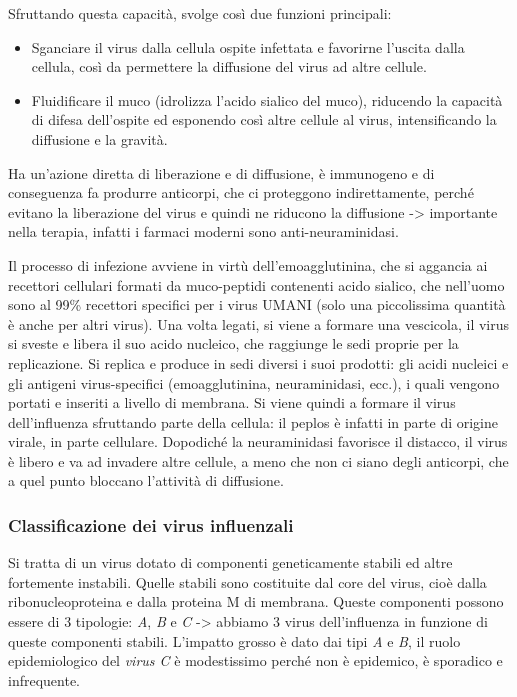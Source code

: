 \begin{itemize}
  Sfruttando questa capacità, svolge così due funzioni principali:

\begin{itemize}
\item
  Sganciare il virus dalla cellula ospite infettata e favorirne l'uscita
  dalla cellula, così da permettere la diffusione del virus ad altre
  cellule.
\item
  Fluidificare il muco (idrolizza l'acido sialico del muco), riducendo
  la capacità di difesa dell'ospite ed esponendo così altre cellule al
  virus, intensificando la diffusione e la gravità.
\end{itemize}
  Ha un'azione diretta di liberazione e di diffusione, è immunogeno e di
  conseguenza fa produrre anticorpi, che ci proteggono indirettamente,
  perché evitano la liberazione del virus e quindi ne riducono la
  diffusione -> importante nella terapia, infatti i farmaci moderni sono
  anti-neuraminidasi.
\end{itemize}
  Il processo di infezione avviene in virtù dell'emoagglutinina, che si
  aggancia ai recettori cellulari formati da muco-peptidi contenenti
  acido sialico, che nell'uomo sono al 99\% recettori specifici per i
  virus UMANI (solo una piccolissima quantità è anche per altri virus).
  Una volta legati, si viene a formare una vescicola, il virus si sveste
  e libera il suo acido nucleico, che raggiunge le sedi proprie per la
  replicazione. Si replica e produce in sedi diversi i suoi prodotti:
  gli acidi nucleici e gli antigeni virus-specifici (emoagglutinina,
  neuraminidasi, ecc.), i quali vengono portati e inseriti a livello di
  membrana. Si viene quindi a formare il virus dell'influenza sfruttando
  parte della cellula: il peplos è infatti in parte di origine virale,
  in parte cellulare. Dopodiché la neuraminidasi favorisce il distacco,
  il virus è libero e va ad invadere altre cellule, a meno che non ci
  siano degli anticorpi, che a quel punto bloccano l'attività di
  diffusione.

\subsubsection{Classificazione dei virus influenzali}

  Si tratta di un virus dotato di componenti geneticamente stabili ed
  altre fortemente instabili. Quelle stabili sono costituite dal core
  del virus, cioè dalla ribonucleoproteina e dalla proteina M di
  membrana. Queste componenti possono essere di 3 tipologie: \emph{A},
  \emph{B} e \emph{C} -> abbiamo 3 virus dell'influenza in funzione di
  queste componenti stabili. L'impatto grosso è dato dai tipi \emph{A} e
  \emph{B}, il ruolo epidemiologico del \emph{virus C} è modestissimo
  perché non è epidemico, è sporadico e infrequente.

